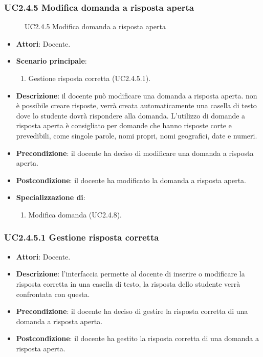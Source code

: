 \subsubsection{UC2.4.5 Modifica domanda a risposta aperta}
\begin{figure}[H]
\centering
\noindent{}
\caption{UC2.4.5 Modifica domanda a risposta aperta}
\end{figure}
\begin{itemize}
\item \textbf{Attori}: Docente.
\item \textbf{Scenario principale}:
\begin{enumerate}
\item Gestione risposta corretta (UC2.4.5.1).
\end{enumerate}
\item \textbf{Descrizione}: il docente può modificare una domanda a risposta aperta. non è possibile creare risposte, verrà creata automaticamente una casella di testo dove lo studente dovrà rispondere alla domanda. L'utilizzo di domande a risposta aperta è consigliato per domande che hanno risposte corte e prevedibili, come singole parole, nomi propri, nomi geografici, date e numeri.
\item \textbf{Precondizione}: il docente ha deciso di modificare una domanda a risposta aperta.
\item \textbf{Postcondizione}: il docente ha modificato la domanda a risposta aperta.
\item \textbf{Specializzazione di}:
\begin{enumerate}
\item Modifica domanda (UC2.4.8).
\end{enumerate}
\end{itemize}
\subsubsection{UC2.4.5.1 Gestione risposta corretta}
\begin{itemize}
\item \textbf{Attori}: Docente.
\item \textbf{Descrizione}: l'interfaccia permette al docente di inserire o modificare la risposta corretta in una casella di testo, la risposta dello studente verrà confrontata con questa.
\item \textbf{Precondizione}: il docente ha deciso di gestire la risposta corretta di una domanda a risposta aperta.
\item \textbf{Postcondizione}: il docente ha gestito la risposta corretta di una domanda a risposta aperta.
\end{itemize}
